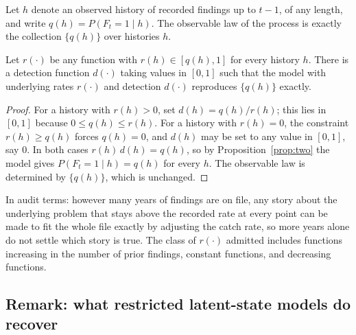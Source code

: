 Let $h$ denote an observed history of recorded findings up to $t-1$, of any
length, and write $q(h) = P(F_t = 1 \mid h)$. The observable law of the process
is exactly the collection $\{q(h)\}$ over histories $h$.

\begin{proposition}\label{prop:full}
Let $r(\cdot)$ be any function with $r(h) \in [q(h), 1]$ for every history $h$.
There is a detection function $d(\cdot)$ taking values in $[0,1]$ such that the
model with underlying rates $r(\cdot)$ and detection $d(\cdot)$ reproduces
$\{q(h)\}$ exactly.
\end{proposition}

\begin{proof}
For a history with $r(h) > 0$, set $d(h) = q(h)/r(h)$; this lies in $[0,1]$
because $0 \leq q(h) \leq r(h)$. For a history with $r(h) = 0$, the constraint
$r(h) \geq q(h)$ forces $q(h) = 0$, and $d(h)$ may be set to any value in
$[0,1]$, say $0$. In both cases $r(h)\,d(h) = q(h)$, so by
Proposition~\ref{prop:two} the model gives $P(F_t=1 \mid h) = q(h)$ for every
$h$. The observable law is determined by $\{q(h)\}$, which is unchanged.
\end{proof}

In audit terms: however many years of findings are on file, any story about
the underlying problem that stays above the recorded rate at every point can
be made to fit the whole file exactly by adjusting the catch rate, so more
years alone do not settle which story is true. The class of $r(\cdot)$
admitted includes functions increasing in the number of prior findings,
constant functions, and decreasing functions.

\subsection{Remark: what restricted latent-state models do recover}


